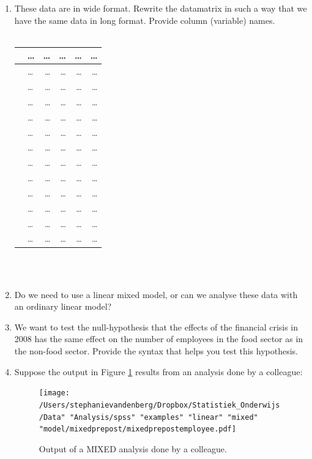 \documentclass[]{report}\usepackage[]{graphicx}\usepackage[]{color}
\begin{document}
\begin{enumerate}
\item These data are in wide format. Rewrite the datamatrix in such a way that we have the same data in long format. Provide column (variable) names. 
\\
 \\
 \begin{tabular}{llrrrr}
   & \dots & \dots  & \dots & \dots  & \dots  \\ \hline
  & \dots & \dots  & \dots & \dots  & \dots  \\
  & \dots & \dots  & \dots & \dots  & \dots  \\
  & \dots & \dots  & \dots & \dots  & \dots  \\
  & \dots & \dots  & \dots & \dots  & \dots  \\
  & \dots & \dots  & \dots & \dots  & \dots  \\
  & \dots & \dots  & \dots & \dots  & \dots  \\
  & \dots & \dots  & \dots & \dots  & \dots  \\
  & \dots & \dots  & \dots & \dots  & \dots  \\
  & \dots & \dots  & \dots & \dots  & \dots  \\
  & \dots & \dots  & \dots & \dots  & \dots  \\
  & \dots & \dots  & \dots & \dots  & \dots  \\
  & \dots & \dots  & \dots & \dots  & \dots  \\
 \end{tabular}
\\
\\
\item Do we need to use a linear mixed model, or can we analyse these data with an ordinary linear model?
\item We want to test the null-hypothesis that the effects of the financial crisis in 2008 has the same effect on the number of employees in the food sector as in the non-food sector. Provide the syntax that helps you test this hypothesis. 
\item Suppose the output in Figure \ref{fig:mixedprepostemployee} results from an analysis done by a colleague:

\begin{figure}[h]
    \begin{center}
       \texttt{[image: /Users/stephanievandenberg/Dropbox/Statistiek\_Onderwijs/Data" "Analysis/spss" "examples" "linear" "mixed" "model/mixedprepost/mixedprepostemployee.pdf]}
    \end{center}
    \label{fig:mixedprepostemployee}
    \caption{Output of a MIXED analysis done by a colleague.}
\end{figure}


\end{enumerate}
\end{document}
